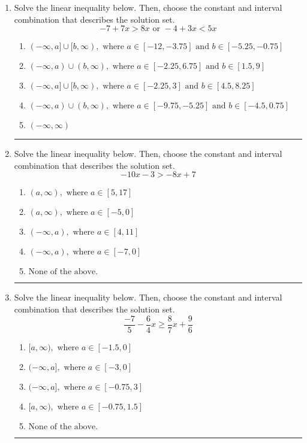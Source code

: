 \documentclass[14pt]{extbook}
\newcommand{\litem}[1]{\item#1\hspace*{-1cm}\rule{\textwidth}{0.4pt}}
\begin{document}
\begin{enumerate}
{\begin{enumerate}[label=\Alph*.]
\end{enumerate} }
\litem{
Solve the linear inequality below. Then, choose the constant and interval combination that describes the solution set.\[ -7 + 7 x > 8 x \text{ or } -4 + 3 x < 5 x \]\begin{enumerate}[label=\Alph*.]
\item \( (-\infty, a] \cup [b, \infty), \text{ where } a \in [-12, -3.75] \text{ and } b \in [-5.25, -0.75] \)
\item \( (-\infty, a) \cup (b, \infty), \text{ where } a \in [-2.25, 6.75] \text{ and } b \in [1.5, 9] \)
\item \( (-\infty, a] \cup [b, \infty), \text{ where } a \in [-2.25, 3] \text{ and } b \in [4.5, 8.25] \)
\item \( (-\infty, a) \cup (b, \infty), \text{ where } a \in [-9.75, -5.25] \text{ and } b \in [-4.5, 0.75] \)
\item \( (-\infty, \infty) \)

\end{enumerate} }
\litem{
Solve the linear inequality below. Then, choose the constant and interval combination that describes the solution set.\[ -10x -3 > -8x + 7 \]\begin{enumerate}[label=\Alph*.]
\item \( (a, \infty), \text{ where } a \in [5, 17] \)
\item \( (a, \infty), \text{ where } a \in [-5, 0] \)
\item \( (-\infty, a), \text{ where } a \in [4, 11] \)
\item \( (-\infty, a), \text{ where } a \in [-7, 0] \)
\item \( \text{None of the above}. \)

\end{enumerate} }
\litem{
Solve the linear inequality below. Then, choose the constant and interval combination that describes the solution set.\[ \frac{-7}{5} - \frac{6}{4} x \geq \frac{8}{7} x + \frac{9}{6} \]\begin{enumerate}[label=\Alph*.]
\item \( [a, \infty), \text{ where } a \in [-1.5, 0] \)
\item \( (-\infty, a], \text{ where } a \in [-3, 0] \)
\item \( (-\infty, a], \text{ where } a \in [-0.75, 3] \)
\item \( [a, \infty), \text{ where } a \in [-0.75, 1.5] \)
\item \( \text{None of the above}. \)


\end{enumerate}}
\end{enumerate}
\end{document}
